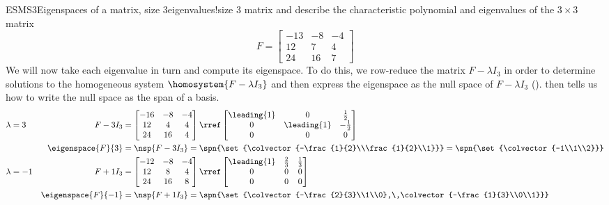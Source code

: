 \begin{example}{ESMS3}{Eigenspaces of a matrix, size 3}{eigenvalues!size 3 matrix}
 and  describe the characteristic polynomial and eigenvalues of the $3\times 3$ matrix 
%
\begin{equation*}
F=
\begin{bmatrix}
-13 & -8 & -4\\ 
12 & 7 & 4\\ 
24 & 16 & 7
\end{bmatrix}
\end{equation*}
%
We will now take each eigenvalue in turn and compute its eigenspace.  To do this, we row-reduce the matrix
$F-\lambda I_3$ in order to determine solutions to the homogeneous system $\homosystem{F-\lambda I_3}$ and then express the eigenspace as the null space of $F-\lambda I_3$ ().   then tells us how to write the null space as the span of a basis.
%
\begin{align*}
%
\lambda&=3&F-3I_3&=
\begin{bmatrix}
-16 & -8 & -4\\ 
12 & 4 & 4\\ 
24 & 16 & 4
\end{bmatrix}
\rref
\begin{bmatrix}
\leading{1} & 0 & \frac{1}{2}\\ 
0 & \leading{1} & -\frac{1}{2}\\ 
0 & 0 & 0
\end{bmatrix}\\
&&\eigenspace{F}{3}&=\nsp{F-3I_3}
=\spn{\set{\colvector{-\frac{1}{2}\\\frac{1}{2}\\1}}}
=\spn{\set{\colvector{-1\\1\\2}}}\\
%
\lambda&=-1&F+1I_3&=
\begin{bmatrix}
-12 & -8 & -4\\ 
12 & 8 & 4\\ 
24 & 16 & 8
\end{bmatrix}
\rref
\begin{bmatrix}
\leading{1} & \frac{2}{3} & \frac{1}{3}\\ 
0 & 0 & 0\\ 
0 & 0 & 0
\end{bmatrix}\\
&&\eigenspace{F}{-1}&=\nsp{F+1I_3}
=\spn{\set{\colvector{-\frac{2}{3}\\1\\0},\,\colvector{-\frac{1}{3}\\0\\1}}}

\end{align*}
\end{example}
